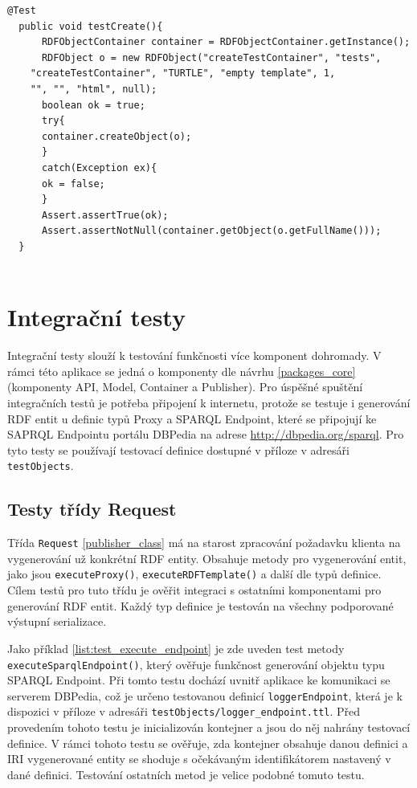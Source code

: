 \documentclass[thesis=B,czech]{FITthesis}[2012/06/26]
\begin{document}
\begin{lstlisting}[float=htb,caption={Unit test třídy RDFObjectContainer: Vytvoření a vložení definice},label=list:test_create]
  @Test
  public void testCreate(){
      RDFObjectContainer container = RDFObjectContainer.getInstance();
      RDFObject o = new RDFObject("createTestContainer", "tests",
	"createTestContainer", "TURTLE", "empty template", 1,
	"", "", "html", null);
      boolean ok = true;
      try{
	  container.createObject(o);
      }
      catch(Exception ex){
	  ok = false;
      }
      Assert.assertTrue(ok);
      Assert.assertNotNull(container.getObject(o.getFullName()));
  }
    
\end{lstlisting}
  
    
  
  \section{Integrační testy}
  Integrační testy slouží k testování funkčnosti více komponent dohromady. V rámci této aplikace se jedná o komponenty dle návrhu \ref{packages_core} 
  (komponenty API, Model, Container a Publisher). Pro úspěšné spuštění integračních testů je potřeba připojení k internetu, protože se testuje i generování
  RDF entit u definic typů Proxy a SPARQL Endpoint, které se připojují ke SAPRQL Endpointu portálu DBPedia na adrese \url{http://dbpedia.org/sparql}.
  Pro tyto testy se používají testovací definice dostupné v příloze v adresáři \texttt{testObjects}.
  
  \subsection{Testy třídy Request}
  Třída \texttt{Request} \ref{publisher_class} má na starost zpracování požadavku klienta na vygenerování už konkrétní RDF entity. Obsahuje metody
  pro vygenerování entit, jako jsou
  \texttt{executeProxy()}, \texttt{executeRDFTemplate()} a další dle typů definice. Cílem testů pro tuto třídu je ověřit integraci s ostatními komponentami
  pro generování RDF entit.   
  Každý typ definice je testován na všechny podporované výstupní serializace.
  
  Jako příklad \ref{list:test_execute_endpoint} je zde uveden test metody \texttt{executeSparqlEndpoint()}, který ověřuje funkčnost generování objektu typu SPARQL Endpoint.
  Při tomto testu dochází uvnitř aplikace ke komunikaci se serverem DBPedia, což je určeno testovanou definicí \texttt{loggerEndpoint}, která je k dispozici v příloze
  v adresáři \texttt{testObjects/logger\_endpoint.ttl}. Před provedením tohoto testu je inicializován kontejner a jsou do něj nahrány testovací definice. 
  V rámci tohoto testu se ověřuje, zda kontejner obsahuje danou definici a IRI vygenerované entity se shoduje s očekávaným identifikátorem nastavený v dané definici.
  Testování ostatních metod je velice podobné tomuto testu.
  
\end{document}
